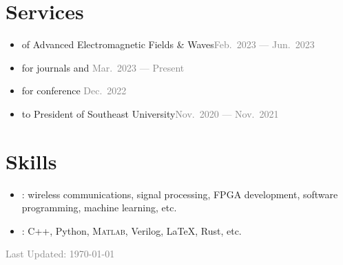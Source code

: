 \documentclass{color-cv}
\begin{document}
\section{Services}
\begin{itemize}
  \item {} of Advanced Electromagnetic Fields \& Waves\hfill\textcolor{gray}{Feb.~2023 --- Jun.~2023}
  \item {} for journals  and \hfill\textcolor{gray}{Mar.~2023 --- Present}
  \item {} for conference \hfill\textcolor{gray}{Dec.~2022}
  \item {} to President of Southeast University\hfill\textcolor{gray}{Nov.~2020 --- Nov.~2021}
\end{itemize}

\section{Skills}
\begin{itemize}
  \item {}: wireless communications, signal processing, FPGA development, software programming, machine learning, etc.
  \item {}: C++, Python, \textsc{Matlab}, Verilog, \LaTeX{}, Rust, etc.
\end{itemize}

\vfill\noindent\centering\textcolor{gray}{\small Last Updated: \today{}}
\end{document}
